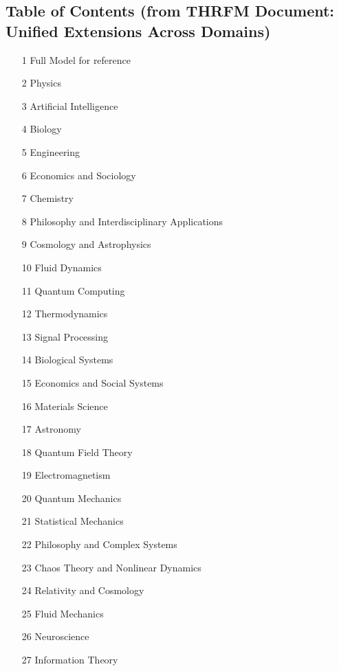 \documentclass[11pt,a4paper]{article}
\begin{document}
\subsection*{Table of Contents (from THRFM Document: Unified Extensions Across Domains)} 
\begin{itemize}
    \item[1] Full Model for reference 
    \item[2] Physics 
    \item[3] Artificial Intelligence 
    \item[4] Biology 
    \item[5] Engineering 
    \item[6] Economics and Sociology 
    \item[7] Chemistry 
    \item[8] Philosophy and Interdisciplinary Applications 
    \item[9] Cosmology and Astrophysics 
    \item[10] Fluid Dynamics 
    \item[11] Quantum Computing 
    \item[12] Thermodynamics 
    \item[13] Signal Processing 
    \item[14] Biological Systems 
    \item[15] Economics and Social Systems 
    \item[16] Materials Science 
    \item[17] Astronomy 
    \item[18] Quantum Field Theory 
    \item[19] Electromagnetism 
    \item[20] Quantum Mechanics 
    \item[21] Statistical Mechanics 
    \item[22] Philosophy and Complex Systems 
    \item[23] Chaos Theory and Nonlinear Dynamics 
    \item[24] Relativity and Cosmology 
    \item[25] Fluid Mechanics 
    \item[26] Neuroscience 
    \item[27] Information Theory 

\end{itemize}
\end{document}
